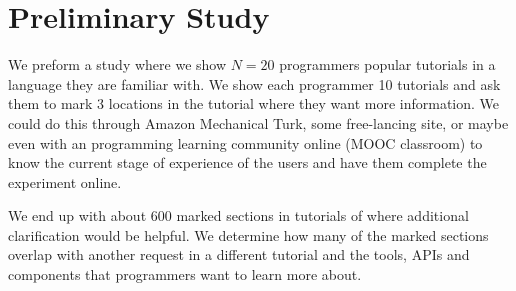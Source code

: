 \section{Preliminary Study}


We preform a study where we show $N=20$ programmers popular tutorials in a language they are familiar with.
We show each programmer 10 tutorials and ask them to mark 3 locations in the tutorial where they want more information.
We could do this through Amazon Mechanical Turk, some free-lancing site, or maybe even with an programming learning community online (MOOC classroom) to know the current stage of experience of the users and have them complete the experiment online.

We end up with about 600 marked sections in tutorials of where additional clarification would be helpful.
We determine how many of the marked sections overlap with another request in a different tutorial and the tools, APIs and components that programmers want to learn more about.
